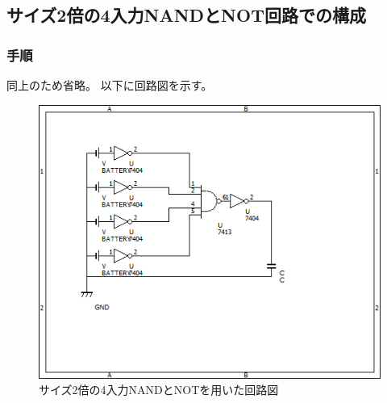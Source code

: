 \documentclass{jsarticle}
\begin{document}
\subsection{サイズ2倍の4入力NANDとNOT回路での構成}
\subsubsection{手順}
    同上のため省略。
    以下に回路図を示す。
    \begin{figure}[H]
        \centering
        \includegraphics[bb=0 0 500 400]{ex3_nand_not.png}
        \caption{サイズ2倍の4入力NANDとNOTを用いた回路図}
    \end{figure}
\end{document}
